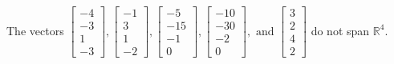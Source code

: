 \begin{exercise}
\begin{exerciseStatement}
  \end{exerciseStatement}
  \begin{exerciseAnswer}
   The vectors \(\left[\begin{array}{r}
-4 \\
-3 \\
1 \\
-3
\end{array}\right] , \left[\begin{array}{r}
-1 \\
3 \\
1 \\
-2
\end{array}\right] , \left[\begin{array}{r}
-5 \\
-15 \\
-1 \\
0
\end{array}\right] , \left[\begin{array}{r}
-10 \\
-30 \\
-2 \\
0
\end{array}\right] , \text{ and } \left[\begin{array}{r}
3 \\
2 \\
4 \\
2
\end{array}\right]\) 
  	 do not  
	span \(\mathbb{R}^4\).
  


  \end{exerciseAnswer}
\end{exercise}